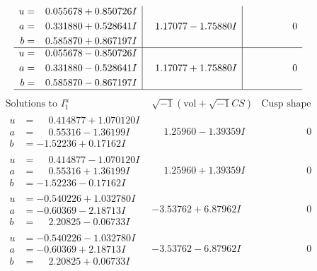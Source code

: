 \documentclass[1p]{elsarticle_modified}
\theoremstyle{definition}
\newcommand{\I}{\sqrt{-1}}
\begin{document}
$$\begin{array}{c|c|c}
\begin{aligned}
u &= \phantom{-}0.055678 + 0.850726 I \\
a &= \phantom{-}0.331880 + 0.528641 I \\
b &= \phantom{-}0.585870 + 0.867197 I\end{aligned}
 & \phantom{-}1.17077 - 1.75880 I & \phantom{-0.000000 } 0 \\ \hline\begin{aligned}
u &= \phantom{-}0.055678 - 0.850726 I \\
a &= \phantom{-}0.331880 - 0.528641 I \\
b &= \phantom{-}0.585870 - 0.867197 I\end{aligned}
 & \phantom{-}1.17077 + 1.75880 I & \phantom{-0.000000 } 0\\
 \hline 
 \end{array}$$\newpage$$\begin{array}{c|c|c}  
\text{Solutions to }I^u_{1}& \I (\text{vol} + \sqrt{-1}CS) & \text{Cusp shape}\\
 \hline 
\begin{aligned}
u &= \phantom{-}0.414877 + 1.070120 I \\
a &= \phantom{-}0.55316 - 1.36199 I \\
b &= -1.52236 + 0.17162 I\end{aligned}
 & \phantom{-}1.25960 - 1.39359 I & \phantom{-0.000000 } 0 \\ \hline\begin{aligned}
u &= \phantom{-}0.414877 - 1.070120 I \\
a &= \phantom{-}0.55316 + 1.36199 I \\
b &= -1.52236 - 0.17162 I\end{aligned}
 & \phantom{-}1.25960 + 1.39359 I & \phantom{-0.000000 } 0 \\ \hline\begin{aligned}
u &= -0.540226 + 1.032780 I \\
a &= -0.60369 - 2.18713 I \\
b &= \phantom{-}2.20825 - 0.06733 I\end{aligned}
 & -3.53762 + 6.87962 I & \phantom{-0.000000 } 0 \\ \hline\begin{aligned}
u &= -0.540226 - 1.032780 I \\
a &= -0.60369 + 2.18713 I \\
b &= \phantom{-}2.20825 + 0.06733 I\end{aligned}
 & -3.53762 - 6.87962 I & \phantom{-0.000000 } 0 \\ \hline\begin{aligned}

\end{aligned}
\end{array}$$
\end{document}
